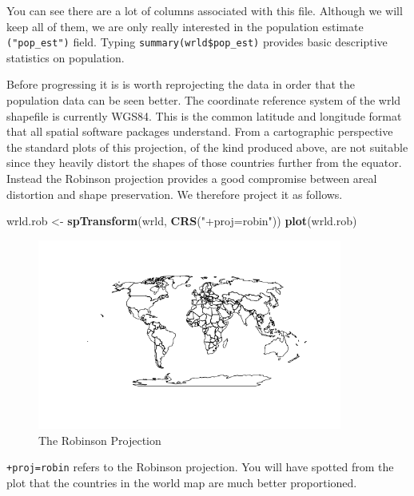 \documentclass[]{article}
\newenvironment{Shaded}{}{}
\newcommand{\KeywordTok}[1]{\textcolor[rgb]{0.00,0.44,0.13}{\textbf{{#1}}}}
\newcommand{\StringTok}[1]{\textcolor[rgb]{0.25,0.44,0.63}{{#1}}}
\newcommand{\NormalTok}[1]{{#1}}
\let\Oldincludegraphics\includegraphics
\renewcommand{\includegraphics}[1]{\Oldincludegraphics[width=10cm]{#1}}
\begin{document}
You can see there are a lot of columns associated with this file.
Although we will keep all of them, we are only really interested in the
population estimate \texttt{("pop\_est")} field. Typing
\texttt{summary(wrld\$pop\_est)} provides basic descriptive statistics
on population.

Before progressing it is is worth reprojecting the data in order that
the population data can be seen better. The coordinate reference system
of the wrld shapefile is currently WGS84. This is the common latitude
and longitude format that all spatial software packages understand. From
a cartographic perspective the standard plots of this projection, of the
kind produced above, are not suitable since they heavily distort the
shapes of those countries further from the equator. Instead the Robinson
projection provides a good compromise between areal distortion and shape
preservation. We therefore project it as follows.

\begin{Shaded}
\begin{Highlighting}[]
\NormalTok{wrld.rob <- }\KeywordTok{spTransform}\NormalTok{(wrld, }\KeywordTok{CRS}\NormalTok{(}\StringTok{"+proj=robin"}\NormalTok{))}
\KeywordTok{plot}\NormalTok{(wrld.rob)}
\end{Highlighting}
\end{Shaded}

\begin{figure}[htbp]
\centering
\includegraphics{figure/The_Robinson_Projection.png}
\caption{The Robinson Projection}
\end{figure}

\texttt{+proj=robin} refers to the Robinson projection. You will have
spotted from the plot that the countries in the world map are much
better proportioned.
\end{document}
